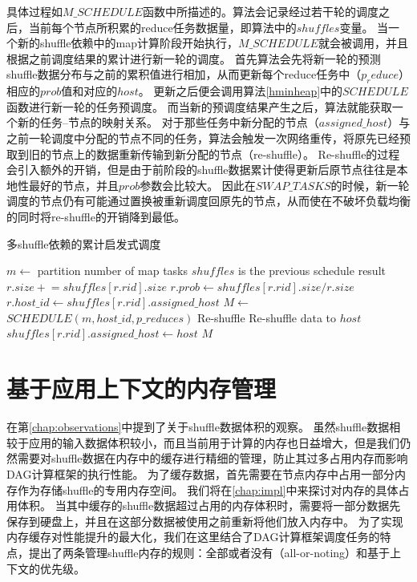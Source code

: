 具体过程如$M\_SCHEDULE$函数中所描述的。算法会记录经过若干轮的调度之后，当前每个节点所积累的reduce任务数据量，即算法中的$shuffles$变量。
当一个新的shuffle依赖中的map计算阶段开始执行，$M\_SCHEDULE$就会被调用，并且根据之前调度结果的累计进行新一轮的调度。
首先算法会先将新一轮的预测shuffle数据分布与之前的累积值进行相加，从而更新每个reduce任务中（$p_reduce$）相应的$prob$值和对应的$host$。
更新之后便会调用算法\ref{hminheap}中的$SCHEDULE$函数进行新一轮的任务预调度。
而当新的预调度结果产生之后，算法就能获取一个新的任务--节点的映射关系。
对于那些任务中新分配的节点（$assigned\_host$）与之前一轮调度中分配的节点不同的任务，算法会触发一次网络重传，将原先已经预取到旧的节点上的数据重新传输到新分配的节点（re-shuffle）。
Re-shuffle的过程会引入额外的开销，但是由于前阶段的shuffle数据累计使得更新后原节点往往是本地性最好的节点，并且$prob$参数会比较大。
因此在$SWAP\_TASKS$的时候，新一轮调度的节点仍有可能通过置换被重新调度回原先的节点，从而使在不破坏负载均衡的同时将re-shuffle的开销降到最低。


\begin{algorithm}[H]
	\caption{多shuffle依赖的累计启发式调度}
	\label{mhminheap}
	\begin{algorithmic}[1]
		\small
			\State $m\gets$ partition number of map tasks
			\Comment $shuffles$ is the previous schedule result
				\State $r.size \mathrel{+}= shuffles\left[r.rid\right].size$
					\State $r.prob\gets shuffles\left[r.rid\right].size / r.size$
					\State $r.host\_id\gets shuffles\left[r.rid\right].assigned\_host$
				\EndIf
			\EndFor
			\State $M\gets$ $SCHEDULE\left(m, host\_id, p\_reduces\right)$
				\Comment Re-shuffle
					\State Re-shuffle data to $host$
					\State $shuffles\left[r.rid\right].assigned\_host\gets host$
					\EndIf
				\EndFor
			\EndFor
			\Return $M$
		\EndProcedure
	\end{algorithmic}
\end{algorithm}

\section{基于应用上下文的内存管理}

在第\ref{chap:observations}中提到了关于shuffle数据体积的观察。
虽然shuffle数据相较于应用的输入数据体积较小，而且当前用于计算的内存也日益增大，但是我们仍然需要对shuffle数据在内存中的缓存进行精细的管理，防止其过多占用内存而影响DAG计算框架的执行性能。
为了缓存数据，首先需要在节点内存中占用一部分内存作为存储shuffle的专用内存空间。
我们将在\ref{chap:impl}中来探讨对内存的具体占用体积。
当其中缓存的shuffle数据超过占用的内存体积时，需要将一部分数据先保存到硬盘上，并且在这部分数据被使用之前重新将他们放入内存中。
为了实现内存缓存对性能提升的最大化，我们在这里结合了DAG计算框架调度任务的特点，提出了两条管理shuffle内存的规则：全部或者没有（all-or-noting）和基于上下文的优先级。

